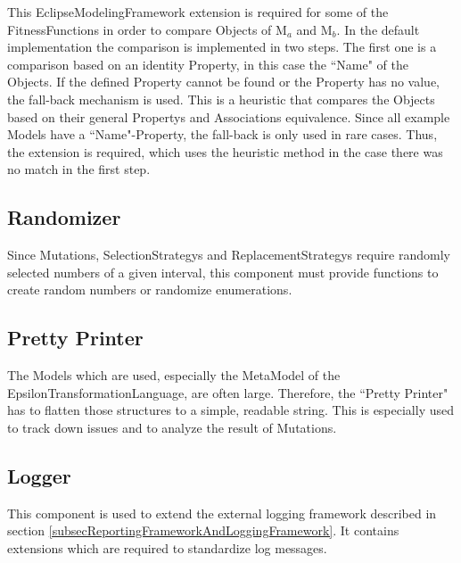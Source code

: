 This \gls{EclipseModelingFramework} extension is required for some of the \glspl{FitnessFunction} in order to compare \glspl{Object} of M$_a$ and M$_b$. In the default implementation the comparison is implemented in two steps. The first one is a comparison based on an identity \gls{Property}, in this case the ``Name" of the \glspl{Object}. If the defined \gls{Property} cannot be found or the \gls{Property} has no value, the fall-back mechanism is used. This is a heuristic that compares the \glspl{Object} based on their general \glspl{Property} and \glspl{Association} equivalence. Since all example \glspl{Model} have a ``Name"-\gls{Property}, the fall-back is only used in rare cases. Thus, the extension is required, which uses the heuristic method in the case there was no match in the first step.

\subsection{Randomizer}

Since \glspl{Mutation}, \glspl{SelectionStrategy} and \glspl{ReplacementStrategy} require randomly selected numbers of a given interval, this component must provide functions to create random numbers or randomize enumerations.

\subsection{Pretty Printer}

The \glspl{Model} which are used, especially the \gls{MetaModel} of the \gls{EpsilonTransformationLanguage}, are often large. Therefore, the ``Pretty Printer" has to flatten those structures to a simple, readable string. This is especially used to track down issues and to analyze the result of \glspl{Mutation}.

\subsection{Logger}

This component is used to extend the external logging framework described in section \ref{subsecReportingFrameworkAndLoggingFramework}. It contains extensions which are required to standardize log messages.
